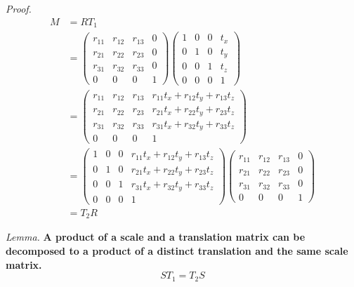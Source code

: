 \documentclass{article}
\begin{document}
\noindent\textit{Proof.}
\begin{align}
M &= RT_1 \\
&=
\begin{pmatrix}
r_{11} & r_{12} & r_{13} & 0\\
r_{21} & r_{22} & r_{23} & 0\\
r_{31} & r_{32} & r_{33} & 0\\
0 & 0 & 0 & 1
\end{pmatrix}
\begin{pmatrix}
1 & 0 & 0 & t_x\\
0 & 1 & 0 & t_y\\
0 & 0 & 1 & t_z\\
0 & 0 & 0 & 1
\end{pmatrix}\\
&=
\begin{pmatrix}
r_{11} & r_{12} & r_{13} & r_{11}t_x + r_{12}t_y + r_{13}t_z\\
r_{21} & r_{22} & r_{23} & r_{21}t_x + r_{22}t_y + r_{23}t_z\\
r_{31} & r_{32} & r_{33} & r_{31}t_x + r_{32}t_y + r_{33}t_z\\
0 & 0 & 0 & 1
\end{pmatrix}\\
&=
\begin{pmatrix}
1 & 0 & 0 & r_{11}t_x + r_{12}t_y + r_{13}t_z\\
0 & 1 & 0 & r_{21}t_x + r_{22}t_y + r_{23}t_z\\
0 & 0 & 1 & r_{31}t_x + r_{32}t_y + r_{33}t_z\\
0 & 0 & 0 & 1
\end{pmatrix}
\begin{pmatrix}
r_{11} & r_{12} & r_{13} & 0\\
r_{21} & r_{22} & r_{23} & 0\\
r_{31} & r_{32} & r_{33} & 0\\
0 & 0 & 0 & 1
\end{pmatrix}\\
&= T_2 R
\end{align}

\noindent
\textit{Lemma.}\textbf{ A product of a scale and a translation matrix can be decomposed to a product of a distinct translation and the same scale matrix.}
\begin{equation}
S T_1 = T_2 S
\end{equation}
\end{document}

